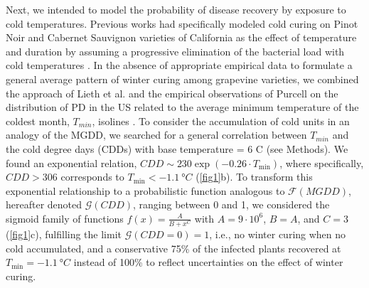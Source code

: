 Next, we intended to model the probability of disease recovery by exposure to
cold temperatures. Previous works had specifically modeled cold curing on
Pinot Noir and Cabernet Sauvignon varieties of California as the effect of
temperature and duration \cite{Lieth2011} by assuming a progressive elimination
of the bacterial load with cold temperatures \cite{Feil2003}. In the absence of
appropriate empirical data to formulate a general average pattern of winter
curing among grapevine varieties, we combined the approach of Lieth et al.
\cite{Lieth2011} and the empirical observations of Purcell on the distribution
of PD in the US related to the average minimum temperature of the coldest
month, $T_{min}$, isolines \cite{Anas2008}. To consider
the accumulation of cold units in an analogy of the MGDD, we searched for a
general correlation between $T_{min}$ and the cold degree days (CDDs) with base
temperature = $6$ \textdegree C (see Methods). We found an exponential
relation, $CDD \sim 230\exp(-0.26\cdot T_{\textrm{min}})$, where specifically,
$CDD>306$ corresponds to $T_{\textrm{min}}<\SI{-1.1}{\degree C}$
(\cref{fig1}b). To transform this exponential relationship to a probabilistic
function analogous to $\mathcal{F}(MGDD)$, hereafter denoted
$\mathcal{G}(CDD)$, ranging between 0 and 1, we considered the sigmoid family
of functions $\displaystyle f(x)=\frac{A}{B+x^C}$ with $A=9\cdot 10^6$, $B=A$,
and $C=3$ (\cref{fig1}c), fulfilling the limit $\mathcal{G}(CDD=0)=1$, i.e., no
winter curing when no cold accumulated, and a conservative 75\% of the infected
plants recovered at $T_{\textrm{min}}=\SI{-1.1}{\degree C}$ instead of 100\% to
reflect uncertainties on the effect of winter curing.

